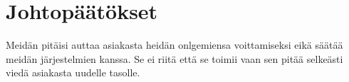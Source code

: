 \documentclass[finnish,12pt,a4paper,pdftex]{article}
\begin{document}



\clearpage

\section{Johtopäätökset}
Meidän pitäisi auttaa asiakasta heidän onlgemiensa voittamiseksi eikä säätää meidän järjestelmien kanssa. Se ei riitä että se toimii vaan sen pitää selkeästi viedä asiakasta uudelle tasolle.
\end{document}
